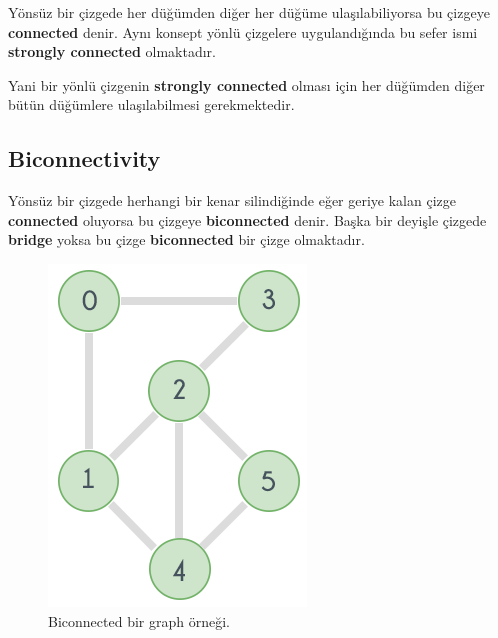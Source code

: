 \documentclass[12pt]{article}
\begin{document}
	Yönsüz bir çizgede her düğümden diğer her düğüme ulaşılabiliyorsa bu çizgeye \textbf{connected} denir. Aynı konsept yönlü çizgelere uygulandığında bu sefer ismi \textbf{strongly connected} olmaktadır.
	
	Yani bir yönlü çizgenin \textbf{strongly connected} olması için her düğümden diğer bütün düğümlere ulaşılabilmesi gerekmektedir.
	\subsection{Biconnectivity}
	Yönsüz bir çizgede herhangi bir kenar silindiğinde eğer geriye kalan çizge \textbf{connected} oluyorsa bu çizgeye \textbf{biconnected} denir. Başka bir deyişle çizgede \textbf{bridge} yoksa bu çizge \textbf{biconnected} bir çizge olmaktadır.
\begin{figure}[H]
\centering
\includegraphics[width=\linewidth/3]{biconnectivity.png}
\caption{Biconnected bir graph örneği.}
\label{fig:prime1}
\end{figure}
\end{document}
